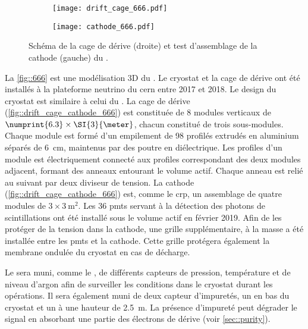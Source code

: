       \begin{figure}[htbp]
        \begin{subfigure}{0.48\textwidth}
          \centering
          \texttt{[image: drift\_cage\_666.pdf]}
        \end{subfigure}\hfill
        \begin{subfigure}{0.48\textwidth}
          \centering
          \texttt{[image: cathode\_666.pdf]}
        \end{subfigure}
        \caption[Cathode et cage de dérive du \SSS{}.]{\label{fig::drift_cage_cathode_666}Schéma de la cage de dérive (droite) et test d'assemblage de la cathode (gauche) du \SSS{}.}
      \end{figure}

      La \autoref{fig::666} est une modélisation 3D du \SSS{}. Le cryostat et la cage de dérive ont été installés à la plateforme neutrino du \gls{cern} entre 2017 et 2018. Le design du cryostat est similaire à celui du \TOO{}. La cage de dérive (\autoref{fig::drift_cage_cathode_666}) est constituée de 8 modules verticaux de $\numprint{6.3}\times\SI{3}{\meter}$, chacun constitué de trois sous-modules. Chaque module est formé d'un empilement de 98 profilés extrudés en aluminium séparés de \SI{6}{\centi\meter}, maintenus par des poutre en diélectrique. Les profiles d'un module est électriquement connecté aux profiles correspondant des deux modules adjacent, formant des anneaux entourant le volume actif. Chaque anneau est relié au suivant par deux diviseur de tension. La cathode (\autoref{fig::drift_cage_cathode_666}) est, comme le \gls{crp}, un assemblage de quatre modules de $3\times\SI{3}{\meter\squared}$. Les 36 \glspl{pmt} servant à la détection des photons de scintillations ont été installé sous le volume actif en février 2019. Afin de les protéger de la tension dans la cathode, une grille supplémentaire, à la masse a été installée entre les \glspl{pmt} et la cathode. Cette grille protégera également la membrane ondulée du cryostat en cas de décharge. 

      Le \SSS{} sera muni, comme le \TOO{}, de différents capteurs de pression, température et de niveau d'argon afin de surveiller les conditions dans le cryostat durant les opérations. Il sera également muni de deux capteur d'impuretés, un en bas du cryostat et un à une hauteur de \SI{2.5}{\meter}. La présence d'impureté peut dégrader le signal en absorbant une partie des électrons de dérive (voir \autoref{sec::purity}).


